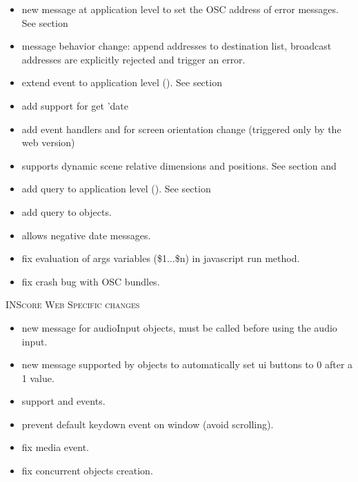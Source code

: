 
\newcommand{\inscoreweb}	{\hspace{4mm} \textsc{INScore Web Specific changes}}

\begin{itemize}
\item new  message at application level to set the OSC address of error messages. See section 
\item {} message behavior change: append addresses to destination list, broadcast addresses are explicitly rejected and trigger an error.
\item extend  event to application level (). See section 
\item add support for get 'date%
\item add event handlers  and  for screen orientation change (triggered only by the web version)
\item supports dynamic scene relative dimensions and positions. See section  and 
\item add  query to application level (). See section 
\item add  query to  objects.
\item allows negative date messages.
\item fix evaluation of args variables (\$1...\$n) in javascript run method.
\item fix crash bug with OSC bundles.
\end{itemize}

\inscoreweb
\begin{itemize}
\item new  message for audioInput objects, must be called before using the audio input.
\item new  message supported by  objects to automatically set ui buttons to 0 after a 1 value.
\item support  and  events.
\item prevent default keydown event on window (avoid scrolling).
\item fix media  event.
\item fix concurrent  objects creation.
\end{itemize}

